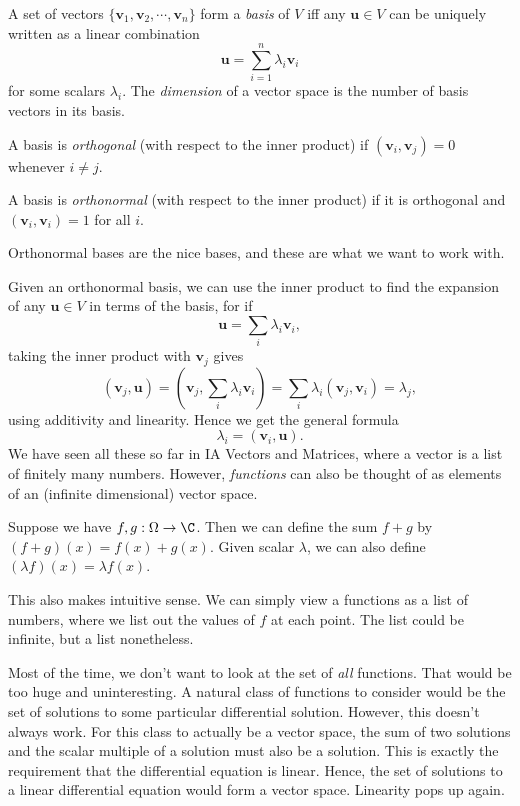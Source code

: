 \documentclass[a4paper]{article}
\begin{document}
\begin{defi}[Basis]
  A set of vectors $\{\mathbf{v}_1, \mathbf{v}_2, \cdots, \mathbf{v}_n\}$ form a \emph{basis} of $V$ iff any $\mathbf{u}\in V$ can be uniquely written as a linear combination
  \[
    \mathbf{u} = \sum_{i = 1}^n \lambda_i \mathbf{v}_i
  \]
  for some scalars $\lambda_i$. The \emph{dimension} of a vector space is the number of basis vectors in its basis.

  A basis is \emph{orthogonal} (with respect to the inner product) if $(\mathbf{v}_i, \mathbf{v}_j) = 0$ whenever $i\not = j$.

  A basis is \emph{orthonormal} (with respect to the inner product) if it is orthogonal and $(\mathbf{v}_i, \mathbf{v}_i) = 1$ for all $i$.
\end{defi}
Orthonormal bases are the nice bases, and these are what we want to work with.

Given an orthonormal basis, we can use the inner product to find the expansion of any $\mathbf{u}\in V$ in terms of the basis, for if
\[
  \mathbf{u} = \sum_i \lambda_i \mathbf{v}_i,
\]
taking the inner product with $\mathbf{v}_j$ gives
\[
  (\mathbf{v}_j, \mathbf{u}) = \left(\mathbf{v}_j, \sum_i \lambda_i \mathbf{v}_i\right) = \sum_i \lambda_i (\mathbf{v}_j, \mathbf{v}_i) = \lambda_j,
\]
using additivity and linearity. Hence we get the general formula
\[
  \lambda_i = (\mathbf{v}_i, \mathbf{u}).
\]
We have seen all these so far in IA Vectors and Matrices, where a vector is a list of finitely many numbers. However, \emph{functions} can also be thought of as elements of an (infinite dimensional) vector space.

Suppose we have $f, g: \Omega \to \C$. Then we can define the sum $f + g$ by $(f + g)(x) = f(x) + g(x)$. Given scalar $\lambda$, we can also define $(\lambda f)(x) = \lambda f(x)$.

This also makes intuitive sense. We can simply view a functions as a list of numbers, where we list out the values of $f$ at each point. The list could be infinite, but a list nonetheless.

Most of the time, we don't want to look at the set of \emph{all} functions. That would be too huge and uninteresting. A natural class of functions to consider would be the set of solutions to some particular differential solution. However, this doesn't always work. For this class to actually be a vector space, the sum of two solutions and the scalar multiple of a solution must also be a solution. This is exactly the requirement that the differential equation is linear. Hence, the set of solutions to a linear differential equation would form a vector space. Linearity pops up again.
\end{document}
